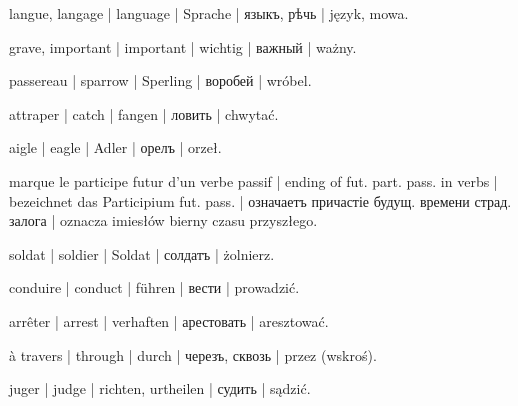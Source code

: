 \begin{ekzvocab}{1em}
 langue, langage | language | Sprache | языкъ, рѣчь | język, mowa.

 grave, important | important | wichtig | важный | ważny.

 passereau | sparrow | Sperling | воробей | wróbel.

 attraper | catch | fangen | ловить | chwytać.

 aigle | eagle | Adler | орелъ | orzeł.

 marque le participe futur d’un verbe passif | ending of fut. part. pass. in verbs | bezeichnet das Participium fut. pass. | означаетъ причастіе будущ. времени страд. залога | oznacza imiesłów bierny czasu przyszłego.

 soldat | soldier | Soldat | солдатъ | żolnierz.

 conduire | conduct | führen | вести | prowadzić.

 arrêter | arrest | verhaften | арестовать | aresztować.

 à travers | through | durch | черезъ, сквозь | przez (wskroś).

 juger | judge | richten, urtheilen | судить | sądzić.

\end{ekzvocab}


